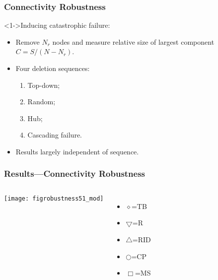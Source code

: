 \begin{frame}
  \frametitle{Connectivity Robustness}

  \begin{block}<1->{Inducing catastrophic failure:}
    \begin{itemize}
    \item<1->
      Remove $N_r$ nodes and measure relative size
      of largest component $C = S/(N-N_r)$.
    \item<2-> 
      Four deletion sequences:
      \begin{enumerate}
      \item 
        Top-down;
      \item 
        Random;
      \item 
        Hub;
      \item 
        Cascading failure.
      \end{enumerate}
    \item<3->
      Results largely independent of sequence.
    \end{itemize}
  \end{block}
  
\end{frame}

\begin{frame}
  \frametitle{Results---Connectivity Robustness}

  \begin{columns}
    \texttt{[image: figrobustness51\_mod]}
    \begin{itemize}
    \item[] 
        {\Large$\diamond$}=TB
    \item[]
        $\bigtriangledown$=R
    \item[]
        $\bigtriangleup$=RID 
    \item[]
        {\small$\bigcirc$}=CP
    \item[]
        $\Box$=MS 
    \end{itemize}
  \end{columns}

    

\end{frame}

